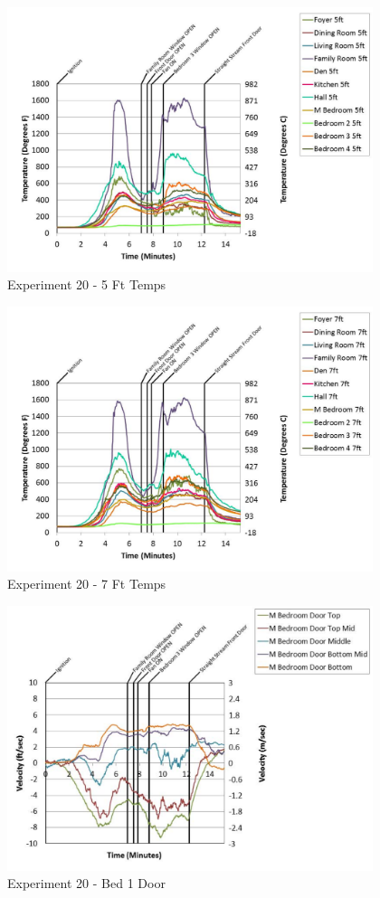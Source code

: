 \documentclass{article}
\begin{document}
\begin{appendices}
	\begin{figure}[h!]
		\centering
		\includegraphics[height=3.05in]{0_Images/Results_Charts/Exp_20_Charts/5FtTemps.pdf}
		\caption{Experiment 20 - 5 Ft Temps}
	\end{figure}
 

	\begin{figure}[h!]
		\centering
		\includegraphics[height=3.05in]{0_Images/Results_Charts/Exp_20_Charts/7FtTemps.pdf}
		\caption{Experiment 20 - 7 Ft Temps}
	\end{figure}
 
	\clearpage

	\begin{figure}[h!]
		\centering
		\includegraphics[height=3.05in]{0_Images/Results_Charts/Exp_20_Charts/Bed1Door.pdf}
		\caption{Experiment 20 - Bed 1 Door}
	\end{figure}
 


\end{appendices}
\end{document}
